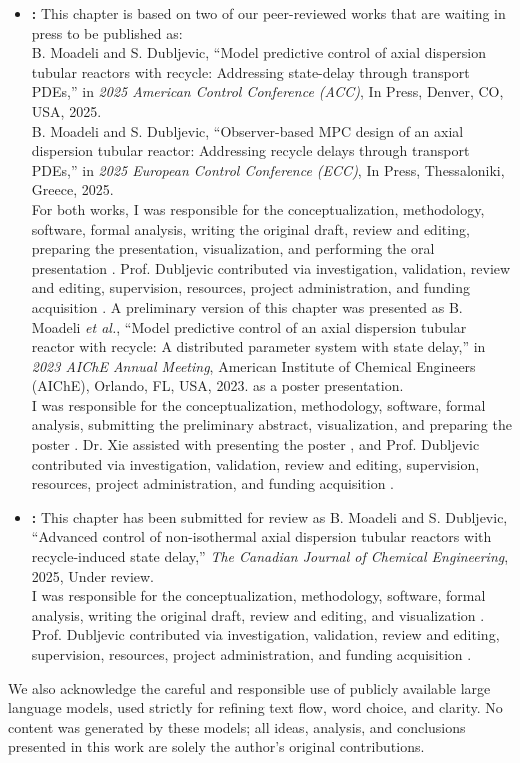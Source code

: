 {\begin{itemize}
		\item \textbf{:} This chapter is based on two of our peer-reviewed works that are waiting in press to be published as:\\{%
			B. Moadeli and S. Dubljevic, “Model predictive control of axial dispersion tubular reactors with recycle: Addressing state-delay through transport PDEs,” in \emph{2025 American Control Conference (ACC)}, In Press, Denver, CO, USA, 2025.
		}\\{%
			B. Moadeli and S. Dubljevic, “Observer-based MPC design of an axial dispersion tubular reactor: Addressing recycle delays through transport PDEs,” in \emph{2025 European Control Conference (ECC)}, In Press, Thessaloniki, Greece, 2025.
		}\\
		For both works, I was responsible for the {%
			conceptualization, methodology, software, formal analysis, writing the original draft, review and editing, preparing the presentation, visualization, and performing the oral presentation
		}. Prof. Dubljevic contributed via {%
			investigation, validation, review and editing, supervision, resources, project administration, and funding acquisition
		}.
		A preliminary version of this chapter was presented as {%
			B. Moadeli \emph{et al.}, “Model predictive control of an axial dispersion tubular reactor with recycle: A distributed parameter system with state delay,” in \emph{2023 AIChE Annual Meeting}, American Institute of Chemical Engineers (AIChE), Orlando, FL, USA, 2023.
		} as a poster presentation.\\
		I was responsible for the {%
			conceptualization, methodology, software, formal analysis, submitting the preliminary abstract, visualization, and preparing the poster
		}. Dr. Xie assisted with {%
			presenting the poster
		}, and Prof. Dubljevic contributed via {%
			investigation, validation, review and editing, supervision, resources, project administration, and funding acquisition
		}.
		\item \textbf{:} This chapter has been submitted for review as {%
			B. Moadeli and S. Dubljevic, “Advanced control of non-isothermal axial dispersion tubular reactors with recycle-induced state delay,” \emph{The Canadian Journal of Chemical Engineering}, 2025, Under review.
		}\\
		I was responsible for the {%
			conceptualization, methodology, software, formal analysis, writing the original draft, review and editing, and visualization
		}. Prof. Dubljevic contributed via {%
			investigation, validation, review and editing, supervision, resources, project administration, and funding acquisition
		}.
	\end{itemize}

	We also acknowledge the careful and responsible use of publicly available large language models, used strictly for refining text flow, word choice, and clarity. No content was generated by these models; all ideas, analysis, and conclusions presented in this work are solely the author’s original contributions.
}
